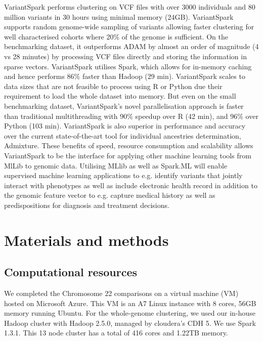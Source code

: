 \documentclass{bmcart}
\newcommand{\variantSpark}{{\sc VariantSpark}}
\begin{document}
\variantSpark{} performs clustering on VCF files with over 3000 individuals and 80 million variants in 30 hours using minimal memory (24GB). 
\variantSpark{} supports random genome-wide sampling of variants allowing faster clustering for well characterised cohorts where 20\% of the genome is sufficient. 
On the benchmarking dataset, it outperforms {\sc ADAM} by almost an order of magnitude (4 vs 28 minutes) by processing VCF files directly and storing the information in sparse vectors. %
\variantSpark{} utilises {\sc Spark}, which allows for in-memory caching and hence performs 86\% faster than Hadoop (29 min). %
\variantSpark{} scales to data sizes that are not feasible to process using R or Python due their requirement to load the whole dataset into memory. 
But even on the small benchmarking dataset, \variantSpark{}'s novel parallelisation approach is faster than traditional multithreading with 90\% speedup over R (42 min), and 96\% over Python (103 min). %
\variantSpark{} is also superior in performance and accuracy over the current state-of-the-art tool for individual ancestries determination, {\sc Admixture}.
These benefits of speed, resource consumption and scalability allows \variantSpark{} to be the interface for applying other machine learning tools from MlLib to genomic data. 
Utilising MLlib as well as Spark.ML will enable supervised machine learning applications to e.g. identify variants that jointly interact with phenotypes as well as include electronic health record in addition to the genomic feature vector to e.g. capture medical history as well as predispositions for diagnosis and treatment decisions. 




\section*{Materials and methods}
\subsection*{Computational resources}
We completed the Chromosome 22 comparisons on a virtual machine (VM) hosted on Microsoft Azure. This VM is an A7 Linux instance with 8 cores, 56GB
memory running Ubuntu. 
For the whole-genome clustering, we used our in-house Hadoop cluster with Hadoop 2.5.0, managed by cloudera's CDH 5. We use Spark 1.3.1. This 13 node
cluster has a total of 416 cores and 1.22TB memory.
\end{document}

